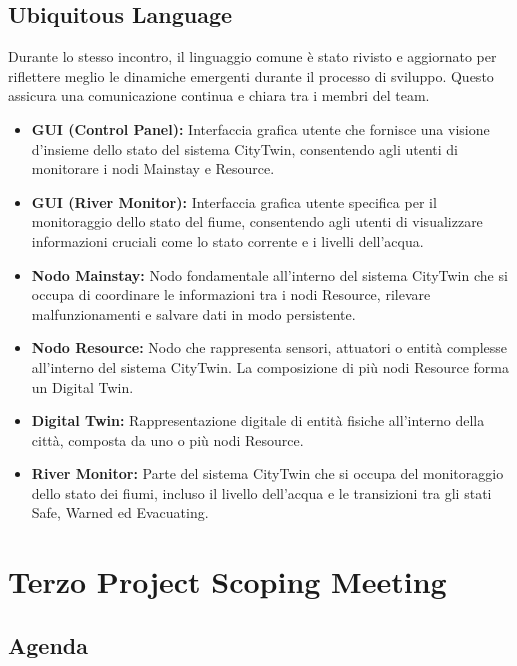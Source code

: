 \subsection{Ubiquitous Language}

Durante lo stesso incontro, il linguaggio comune è stato rivisto e aggiornato per riflettere meglio le dinamiche emergenti durante il processo di sviluppo. Questo assicura una comunicazione continua e chiara tra i membri del team.

\begin{itemize}
    \item \textbf{GUI (Control Panel):} Interfaccia grafica utente che fornisce una visione d'insieme dello stato del sistema CityTwin, consentendo agli utenti di monitorare i nodi Mainstay e Resource.

    \item \textbf{GUI (River Monitor):} Interfaccia grafica utente specifica per il monitoraggio dello stato del fiume, consentendo agli utenti di visualizzare informazioni cruciali come lo stato corrente e i livelli dell'acqua.

    \item \textbf{Nodo Mainstay:} Nodo fondamentale all'interno del sistema CityTwin che si occupa di coordinare le informazioni tra i nodi Resource, rilevare malfunzionamenti e salvare dati in modo persistente.

    \item \textbf{Nodo Resource:} Nodo che rappresenta sensori, attuatori o entità complesse all'interno del sistema CityTwin. La composizione di più nodi Resource forma un Digital Twin.

    \item \textbf{Digital Twin:} Rappresentazione digitale di entità fisiche all'interno della città, composta da uno o più nodi Resource.

    \item \textbf{River Monitor:} Parte del sistema CityTwin che si occupa del monitoraggio dello stato dei fiumi, incluso il livello dell'acqua e le transizioni tra gli stati Safe, Warned ed Evacuating.

\end{itemize}

\section{Terzo Project Scoping Meeting}

\subsection{Agenda}


